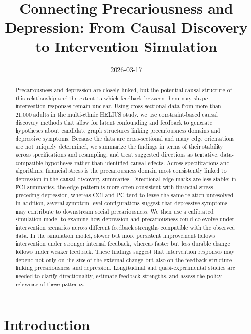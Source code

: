 \documentclass[
]{article}
\title{Connecting Precariousness and Depression: From Causal Discovery
to Intervention Simulation}
\author{%
}
\date{2026-03-17}
\begin{document}
\maketitle
\begin{abstract}
\noindent Precariousness and depression are closely linked, but the
potential causal structure of this relationship and the extent to which
feedback between them may shape intervention responses remain unclear.
Using cross-sectional data from more than 21,000 adults in the
multi-ethnic HELIUS study, we use constraint-based causal discovery
methods that allow for latent confounding and feedback to generate
hypotheses about candidate graph structures linking precariousness
domains and depressive symptoms. Because the data are cross-sectional
and many edge orientations are not uniquely determined, we summarize the
findings in terms of their stability across specifications and
resampling, and treat suggested directions as tentative, data-compatible
hypotheses rather than identified causal effects. Across specifications
and algorithms, financial stress is the precariousness domain most
consistently linked to depression in the causal discovery summaries.
Directional edge marks are less stable: in FCI summaries, the edge
pattern is more often consistent with financial stress preceding
depression, whereas CCI and PC tend to leave the same relation
unresolved. In addition, several symptom-level configurations suggest
that depressive symptoms may contribute to downstream social
precariousness. We then use a calibrated simulation model to examine how
depression and precariousness could co-evolve under intervention
scenarios across different feedback strengths compatible with the
observed data. In the simulation model, slower but more persistent
improvement follows intervention under stronger internal feedback,
whereas faster but less durable change follows under weaker feedback.
These findings suggest that intervention responses may depend not only
on the size of the external change but also on the feedback structure
linking precariousness and depression. Longitudinal and
quasi-experimental studies are needed to clarify directionality,
estimate feedback strengths, and assess the policy relevance of these
patterns.
\end{abstract}


\section{Introduction}\label{introduction}
\end{document}
